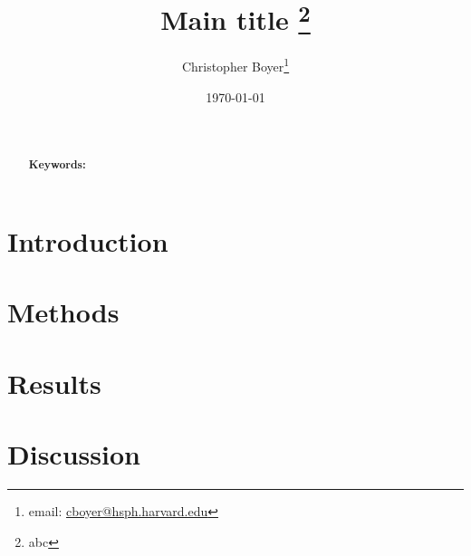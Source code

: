 \documentclass[11pt]{article}
\begin{document}
\begin{titlepage}
\title{Main title \thanks{abc}}
\author[1]{Christopher Boyer\thanks{email: \href{mailto:cboyer@hsph.harvard.edu}{cboyer@hsph.harvard.edu}}}
\date{\today}
\maketitle

\begin{abstract}
\noindent \\
\vspace{0in} \\
\noindent\textbf{Keywords:} 
\bigskip
\end{abstract}
\setcounter{page}{0}
\thispagestyle{empty}
\end{titlepage}
\pagebreak \newpage

\doublespacing

\section{Introduction} \label{sec:introduction}

\section{Methods} \label{sec:methods}

\section{Results} \label{sec:results}

\section{Discussion} \label{sec:discussion}



\end{document}
